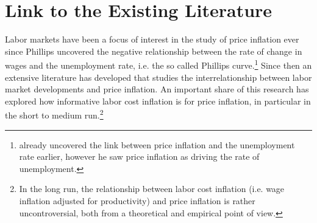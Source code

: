 \documentclass[11pt]{article}
\begin{document}


\section{Link to the Existing Literature}
\label{Literature}
Labor markets have been a focus of interest in the study of price inflation ever since Phillips uncovered the negative relationship between the rate of change in wages and the unemployment rate, i.e. the so called Phillips curve.\footnote{\cite{Fisher1926} already uncovered the link between price inflation and the unemployment rate earlier, however he saw price inflation as driving the rate of unemployment.}
Since then an extensive literature has developed that studies the interrelationship between labor market developments and price inflation. An important share of this research has explored how informative labor cost inflation is for price inflation, in particular in the short to medium run.\footnote{In the long run, the relationship between labor cost inflation (i.e. wage inflation adjusted for productivity) and price inflation is rather uncontroversial, both from a theoretical and empirical point of view.}
\end{document}
